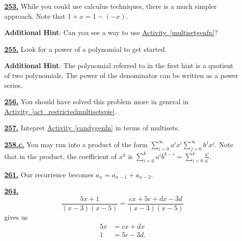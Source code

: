 \documentclass[10pt,]{book}
\theoremstyle{plain}
\theoremstyle{definition}
\theoremstyle{definition}
\theoremstyle{definition}
\numberwithin{equation}{chapter}
\newcommand{\amp}{&}
\begin{document}
\begin{itemize}[itemsep=1em]
\hypertarget{a-253}{}\item[\textbf{\hyperref[negnchoosek]{253.}}]
\hypertarget{p-1317}{}%
While you could use calculus techniques, there is a much simpler approach. Note that \(1 + x = 1 - (-x)\).%

\par\smallskip
\noindent\textbf{Additional Hint}: \hypertarget{p-1318}{}%
Can you see a way to use \hyperref[multisetgenfn]{Activity~\ref{multisetgenfn}}?%

\hypertarget{a-255}{}\item[\textbf{\hyperref[candygenfn]{255.}}]
\hypertarget{p-1323}{}%
Look for a power of a polynomial to get started.%

\par\smallskip
\noindent\textbf{Additional Hint}: \hypertarget{p-1324}{}%
The polynomial referred to in the first hint is a quotient of two polynomials.  The power of the denominator can be written as a power series.%

\hypertarget{a-256}{}\item[\textbf{\hyperref[activity-249]{256.}}]
\hypertarget{p-1328}{}%
You should have solved this problem more in general in \hyperref[act_restrictedmultisetspie]{Activity~\ref{act_restrictedmultisetspie}}.%

\hypertarget{a-257}{}\item[\textbf{\hyperref[activity-250]{257.}}]
\hypertarget{p-1330}{}%
Intepret \hyperref[candygenfn]{Activity~\ref{candygenfn}} in terms of multisets.%

\hypertarget{a-258.c}{}\item[\textbf{\hyperref[task-246]{258.c.}}]
\hypertarget{p-1340}{}%
You may run into a product of the form \(\sum_{i=0}^\infty a^ix^i\sum_{j=0}^\infty b^jx^j\). Note that in the product, the coefficient of \(x^k\) is \(\sum_{i=0}^k a^ib^{k-i} = \sum_{i=0}^k \frac{a^i}{b^i}\).%

\hypertarget{a-261}{}\item[\textbf{\hyperref[originalFibonacci]{261.}}]
\hypertarget{p-1348}{}%
Our recurrence becomes \(a_n = a_{n-1} + a_{n-2}\).%

\hypertarget{a-264}{}\item[\textbf{\hyperref[partialfractionsintro]{264.}}]
\hypertarget{p-1357}{}%
%
\begin{equation*}
\frac{5x+1}{(x-3)(x-5)} = \frac{cx+5c+dx-3d}{(x-3)(x-5)}
\end{equation*}
gives us%
\begin{align*}
5x \amp = cx+dx\\
1 \amp= 5c-3d\text{.}
\end{align*}
%


\end{itemize}
\end{document}
